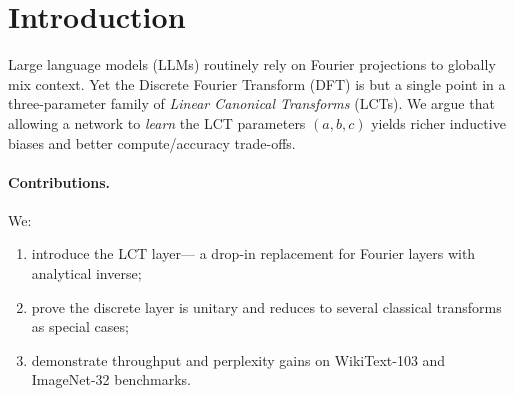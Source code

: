 \section{Introduction}
\label{sec:introduction}
Large language models (LLMs) routinely rely on Fourier projections to globally mix context.  Yet the Discrete Fourier Transform (DFT) is but a single point in a three-parameter family of \emph{Linear Canonical Transforms} (LCTs).  We argue that allowing a network to \emph{learn} the LCT parameters \((a,b,c)\) yields richer inductive biases and better compute/accuracy trade-offs.

\paragraph{Contributions.}  We:
\begin{enumerate}
  \item introduce the \textsc{LCT} layer— a drop-in replacement for Fourier layers with analytical inverse;
  \item prove the discrete layer is unitary and reduces to several classical transforms as special cases;
  \item demonstrate throughput and perplexity gains on WikiText-103 and ImageNet-32 benchmarks.
\end{enumerate}